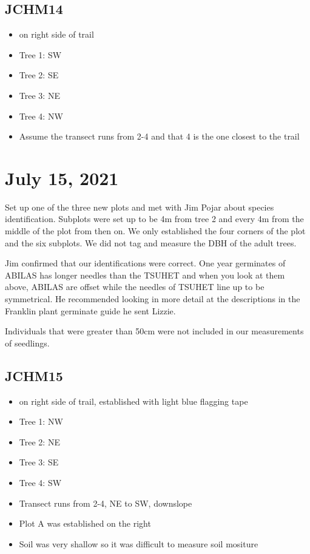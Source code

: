 \documentclass{article}\usepackage[]{graphicx}\usepackage[]{color}
\begin{document}
\subsection{JCHM14}
\begin{itemize}
\item on right side of trail
\item Tree 1: SW
\item Tree 2: SE
\item Tree 3: NE
\item Tree 4: NW
\item Assume the transect runs from 2-4 and that 4 is the one closest to the trail
\end{itemize}

\section{July 15, 2021}
Set up one of the three new plots and met with Jim Pojar about species identification. Subplots were set up to be 4m from tree 2 and every 4m from the middle of the plot from then on. We only established the four corners of the plot and the six subplots. We did not tag and measure the DBH of the adult trees. 

Jim confirmed that our identifications were correct. One year germinates of ABILAS has longer needles than the TSUHET and when you look at them above, ABILAS are offset while the needles of TSUHET line up to be symmetrical. He recommended looking in more detail at the descriptions in the Franklin plant germinate guide he sent Lizzie. 

Individuals that were greater than 50cm were not included in our measurements of seedlings.

\subsection{JCHM15}
\begin{itemize}
\item on right side of trail, established with light blue flagging tape
\item Tree 1: NW
\item Tree 2: NE
\item Tree 3: SE
\item Tree 4: SW
\item Transect runs from 2-4, NE to SW, downslope
\item Plot A was established on the right
\item Soil was very shallow so it was difficult to measure soil mositure
\end{itemize}
\end{document}
